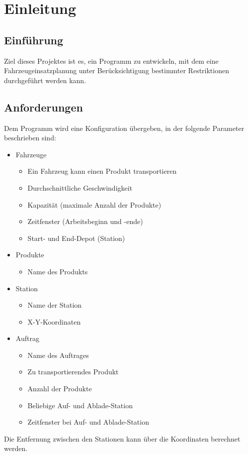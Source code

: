 \section{Einleitung}
\subsection{Einführung}
Ziel dieses Projektes ist es, ein Programm zu entwickeln, mit dem eine Fahrzeugeinsatzplanung unter Berücksichtigung bestimmter Restriktionen durchgeführt werden kann. 


\subsection{Anforderungen}
\label{sec:Anforderungen}
Dem Programm wird eine Konfiguration übergeben, in der folgende Parameter beschrieben sind:
\begin{itemize}
 \item Fahrzeuge
 \begin{itemize}
  \item Ein Fahrzeug kann einen Produkt transportieren
  \item Durchschnittliche Geschwindigkeit
  \item Kapazität (maximale Anzahl der Produkte)
  \item Zeitfenster (Arbeitsbeginn und -ende)
  \item Start- und End-Depot (Station)
 \end{itemize}
 \item Produkte
 \begin{itemize}
  \item Name des Produkts
 \end{itemize}
 \item Station
 \begin{itemize}
  \item Name der Station
  \item X-Y-Koordinaten
 \end{itemize}
 \item Auftrag
 \begin{itemize}
  \item Name des Auftrages
  \item Zu transportierendes Produkt
  \item Anzahl der Produkte
  \item Beliebige Auf- und Ablade-Station
  \item Zeitfenster bei Auf- und Ablade-Station
 \end{itemize}
\end{itemize}
Die Entfernung zwischen den Stationen kann über die Koordinaten berechnet werden. 

